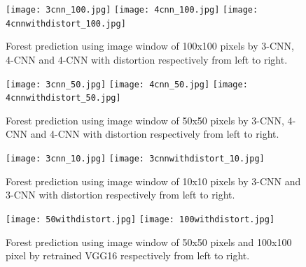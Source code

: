 \documentclass{sigkddExp}
\begin{document}

\begin{figure}[ht!]
\centering
  \texttt{[image: 3cnn\_100.jpg]}
  \texttt{[image: 4cnn\_100.jpg]}
  \texttt{[image: 4cnnwithdistort\_100.jpg]}
  \caption{Forest prediction using image window of 100x100 pixels by 3-CNN, 4-CNN and 4-CNN with distortion respectively from left to right.}
  \label{fig:predict_100}
\end{figure}
\begin{figure}[ht!]
\centering
  \texttt{[image: 3cnn\_50.jpg]}
  \texttt{[image: 4cnn\_50.jpg]}
  \texttt{[image: 4cnnwithdistort\_50.jpg]}
  \caption{Forest prediction using image window of 50x50 pixels by 3-CNN, 4-CNN and 4-CNN with distortion respectively from left to right.}
  \label{fig:predict_50}
\end{figure}
\begin{figure}[ht!]
\centering
  \texttt{[image: 3cnn\_10.jpg]}
  \texttt{[image: 3cnnwithdistort\_10.jpg]}
  \caption{Forest prediction using image window of 10x10 pixels by 3-CNN and 3-CNN with distortion respectively from left to right.}
  \label{fig:predict_10}
\end{figure}
\begin{figure}[ht!]
\centering
  \texttt{[image: 50withdistort.jpg]}
  \texttt{[image: 100withdistort.jpg]}
  \caption{Forest prediction using image window of 50x50 pixels and 100x100 pixel by retrained VGG16 respectively from left to right.}
  \label{fig:predict_VGG}
\end{figure}


\end{document}
